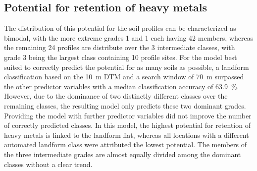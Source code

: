 \documentclass[soilsystems,article,submit,moreauthors,pdftex,10pt,a4paper]{Definitions/mdpi}
\begin{document}
\subsection{Potential for retention of heavy metals}
The distribution of this potential for the soil profiles can be characterized as bimodal, with the  more extreme grades 1 and 1 each having 42 members, whereas the remaining 24 profiles are distribute over the 3 intermediate classes, with grade 3 being the largest class containing 10 profile sites. For the model best suited to correctly predict the potential for as many soils as possible, a landform classification based on the 10~m DTM and a search window of 70~m surpassed the other predictor variables with a median classification accuracy of 63.9~\%. However, due to the dominance of two distinctly different classes over the remaining classes, the resulting model only predicts these two dominant grades. Providing the model with further predictor variables did not improve the number of correctly predicted classes. In this model, the highest potential for retention of heavy metals is linked to the landform flat, whereas all locations with a different automated landform class were attributed the lowest potential. The members of the three intermediate grades are almost equally divided among the dominant classes without a clear trend.
\end{document}
